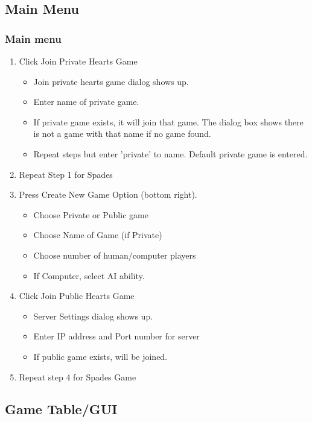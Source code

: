\documentclass[11pt, titlepage]{article}
\begin{document}
\subsection{Main Menu}
	\subsubsection{Main menu}

	\begin{enumerate}
	  \item Click Join Private Hearts Game
			\begin{itemize}
	    \item Join private hearts game dialog shows up.
	    \item Enter name of private game.
	    \item If private game exists, it will join that game. The dialog box shows there is not a game with that name if no game found.
			\item Repeat steps but enter 'private' to name.  Default private game is entered.
	  	\end{itemize}
		\item Repeat Step 1 for Spades
	  \item Press Create New Game Option (bottom right).
	      \begin{itemize}
	    		\item Choose Private or Public game
	    		\item Choose Name of Game (if Private)
	      	\item Choose number of human/computer players
	      	\item If Computer, select AI ability.
	      \end{itemize}
	  \item Click Join Public Hearts Game
			\begin{itemize}
	    	\item Server Settings dialog shows up.
	      \item Enter IP address and Port number for server
	      \item If public game exists, will be joined.
			\end{itemize}
		\item Repeat step 4 for Spades Game
	\end{enumerate}

\subsection{Game Table/GUI}
\end{document}
